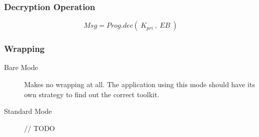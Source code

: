 \documentclass[a4paper,11pt]{article}
\begin{document}
\subsubsection{Decryption Operation}

\begin{displaymath}
	Msg = Prog.dec(~K_{pri}~,~EB~)
\end{displaymath}

\subsubsection{Wrapping}

\begin{description}
	\item[Bare Mode]
		Makes no wrapping at all.
		The application using this mode should have its own strategy to find out the correct toolkit.
	\item[Standard Mode]
		// TODO
\end{description}
\end{document}
